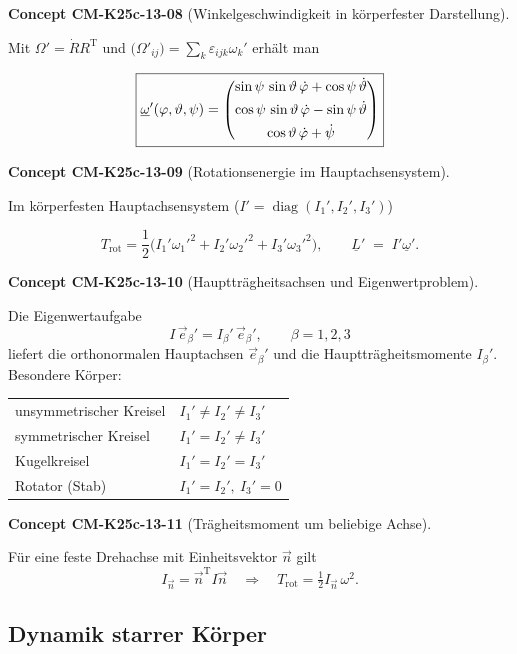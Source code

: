 \documentclass[10pt, letterpaper]{article}
\newcommand{\CustomHeading}[3]{%
  \par\medskip\noindent%
  \textbf{#1 #2} \textnormal{(#3)}.\enskip%
}
\newenvironment{CONC}[2]{\CustomHeading{Concept}{#1}{#2}}{}
\begin{document}
\begin{CONC}{CM-K25c-13-08}{Winkelgeschwindigkeit in körperfester Darstellung}
Mit $\Omega'=\dot R R^{\mathrm T}$ und
$\bigl(\Omega'_{ij}\bigr)=\sum_k\varepsilon_{ijk}\omega_k'$ erhält man

\[
  \boxed{%
    \underline{\omega}'(\varphi,\vartheta,\psi)
    =
    \begin{pmatrix}
      \sin\psi\,\sin\vartheta\,\dot\varphi
      +\cos\psi\,\dot\vartheta \\[4pt]
      \cos\psi\,\sin\vartheta\,\dot\varphi
      -\sin\psi\,\dot\vartheta \\[4pt]
      \cos\vartheta\,\dot\varphi+\dot\psi
    \end{pmatrix}}
\]
\end{CONC}

\begin{CONC}{CM-K25c-13-09}{Rotationsenergie im Hauptachsensystem}
Im körperfesten Hauptachsensystem ($I'=\operatorname{diag}(I_1',I_2',I_3')$)

\[
  T_{\text{rot}}
  =\frac{1}{2}
    \bigl(I_1'\omega_1'^{2}+I_2'\omega_2'^{2}+I_3'\omega_3'^{2}\bigr),
  \qquad
  \underline L'\;=\;I'\underline\omega'.
\]
\end{CONC}

\begin{CONC}{CM-K25c-13-10}{Hauptträgheitsachsen und Eigenwertproblem}
Die Eigenwertaufgabe
\[
  I\,\vec e_\beta' = I_\beta'\,\vec e_\beta',
  \qquad \beta=1,2,3
\]
liefert die orthonormalen Hauptachsen $\vec e_\beta'$ und die
Hauptträgheitsmomente $I_\beta'$.  
Besondere Körper:

\begin{tabular}{@{}ll@{}}
unsymmetrischer Kreisel & $I_1'\neq I_2'\neq I_3'$ \\
symmetrischer Kreisel   & $I_1'=I_2'\neq I_3'$ \\
Kugelkreisel            & $I_1'=I_2'=I_3'$ \\
Rotator (Stab)          & $I_1'=I_2',\ I_3'=0$
\end{tabular}
\end{CONC}

\begin{CONC}{CM-K25c-13-11}{Trägheitsmoment um beliebige Achse}
Für eine feste Drehachse mit Einheitsvektor $\vec n$ gilt
\[
  I_{\vec n}= \vec n^{\mathrm T} I \vec n
  \quad\Longrightarrow\quad
  T_{\text{rot}}=\tfrac12 I_{\vec n}\,\omega^{2}.
\]
\end{CONC}

\subsection{Dynamik starrer Körper}
\end{document}

